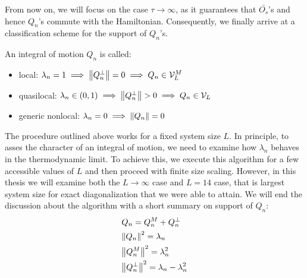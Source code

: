 From now on, we will focus on the case \(\tau \to \infty \), as it guarantees that \(\bar{O_s}\)'s and hence \(Q_n\)'s
commute with the Hamiltonian. 
Consequently, we finally arrive at a classification scheme for the support of \(Q_n\)'s.
\begin{definition}
  An integral of motion \(Q_n\) is called:
  \begin{itemize}
    \item local: \(\lambda_n = 1 \implies \norm{Q_n^{\perp}} = 0 \implies Q_n \in \mathcal{V}^M_L\)
    \item quasilocal: \(\lambda_n \in \left(0,1\right) \implies \norm{Q_n^{\perp}} > 0 \implies Q_n \in \mathcal{V}_L \)
    \item generic nonlocal: \(\lambda_n = 0 \implies \norm{Q_n} = 0\)
  \end{itemize}
  \label{def:classification}
\end{definition}
The procedure outlined above works for a fixed system size \(L\).
In principle, to asses the character of an integral of motion, we need to examine how \(\lambda_n\) behaves in the thermodynamic limit.
To achieve this, we execute this algorithm for a few accessible values of \(L\) and then proceed with finite size scaling.
However, in this thesis we will examine both the \(L\to \infty \) case and \(L = 14\)
case, that is largest system size for exact diagonalization that we were able to attain.
We will end the discussion about the algorithm with a short summary on support of \(Q_n\):
\begin{align}
  & Q_n = Q_n^M + Q_n^{\perp}\nonumber\\
  & \norm{Q_n}^2 = \lambda_n \nonumber\\
  & \norm{Q_n^M}^2 = \lambda_n^2 \nonumber\\
  & \norm{Q_n^{\perp}}^2 = \lambda_n - \lambda_n^2
  \label{eq:summary of support}
\end{align}

